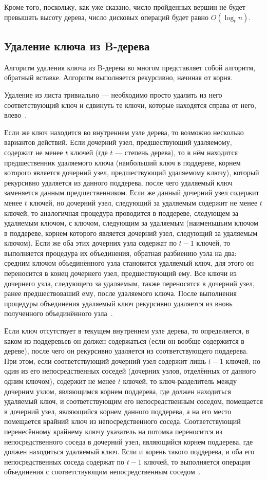 \documentclass[a4paper,12pt]{article}
\begin{document}
	Кроме того, поскольку, как уже сказано, число пройденных вершин не будет превышать высоту дерева, число дисковых операций будет равно $O(\log_t n)$.
	
	\subsection{Удаление ключа из B-дерева}
	
	Алгоритм удаления ключа из B-дерева во многом представляет собой алгоритм, обратный вставке. Алгоритм выполняется рекурсивно, начиная от корня.
	
	Удаление из листа тривиально --- необходимо просто удалить из него соответствующий ключ и сдвинуть те ключи, которые находятся справа от него, влево~\cite{Kormen}.
	
	Если же ключ находится во внутреннем узле дерева, то возможно несколько вариантов действий. Если дочерний узел, предшествующий удаляемому, содержит не менее $t$ ключей (где $t$ --- степень дерева), то в нём находится предшественник удаляемого ключа (наибольший ключ в поддереве, корнем которого является дочерний узел, предшествующий удаляемому ключу), который рекурсивно удаляется из данного поддерева, после чего удаляемый ключ заменяется данным предшественником. Если же данный дочерний узел содержит менее $t$ ключей, но дочерний узел, следующий за удаляемым содержит не менее $t$ ключей, то аналогичная процедура проводится в поддереве, следующем за удаляемым ключом, с ключом, следующим за удаляемым (наименьшьим ключом в поддереве, корнем которого является дочерний узел, следующий за удаляемым ключом). Если же оба этих дочерних узла содержат по $t-1$ ключей, то выполняется процедура их объединения, обратная разбиению узла на два: средним ключом объединённого узла становится удаляемый ключ, для этого он переносится в конец дочернего узел, предшествующий ему. Все ключи из дочернего узла, следующего за удаляемым, также переносятся в дочерний узел, ранее предшествоваший ему, после удаляемого ключа. После выполнения процедуры объединения удаляемый ключ рекурсивно удаляется из вновь полученного объединённого узла~\cite{Kormen}.
	
	Если ключ отсутствует в текущем внутреннем узле дерева, то определяется, в каком из поддеревьев он должен содержаться (если он вообще содержится в дереве), после чего он рекурсивно удаляется из соответствующего поддерева. При этом, если соответствующий дочерний узел содержит лишь $t-1$ ключей, но один из его непосредственных соседей (дочерних узлов, отделённых от данного одним ключом), содержит не менее $t$ ключей, то ключ-разделитель между дочерним узлом, являющимся корнем поддерева, где должен находиться удаляемый ключ, и соответствующим его непосредственным соседом, помещается в дочерний узел, являющийся корнем данного поддерева, а на его место помещается крайний ключ из непосредственного соседа. Соответствующий перенесённому крайнему ключу указатель на потомка переносится из непосредственного соседа в дочерний узел, являющийся корнем поддерева, где должен находиться удаляемый ключ. Если и корень такого поддерева, и оба его непосредственных соседа содержат по $t-1$ ключей, то выполняется операция объединения с соответствующим непосредственным соседом~\cite{Kormen}.
	
\end{document}
